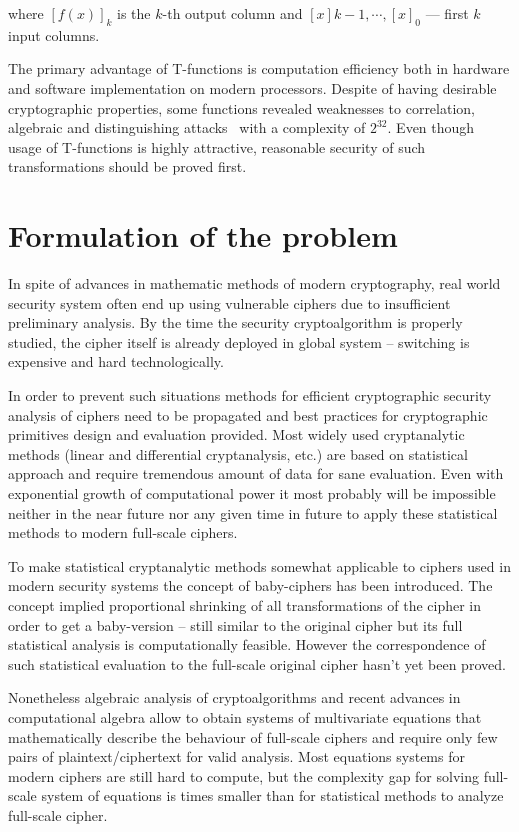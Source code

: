where $\left[ f(x) \right]_k$ is the $k$-th output column and 
$[x]k-1, \cdots, [x]_0$ --- first $k$ input columns.

The primary advantage of T-functions is computation efficiency both in hardware
and software implementation on modern processors. Despite of having desirable
cryptographic properties, some functions revealed weaknesses to correlation,
algebraic and distinguishing attacks~\cite{mycrypt/kunzli_jm05} with a complexity of
$2^{32}$. Even though usage of T-functions is highly attractive, reasonable
security of such transformations should be proved first.


\section{Formulation of the problem}

In spite of advances in mathematic methods of modern cryptography, real world
security system often end up using vulnerable ciphers due to insufficient
preliminary analysis. By the time the security cryptoalgorithm is properly
studied, the cipher itself is already deployed in global system -- switching is
expensive and hard technologically.

In order to prevent such situations methods for efficient cryptographic security
analysis of ciphers need to be propagated and best practices for cryptographic
primitives design and evaluation provided. Most widely used cryptanalytic
methods (linear and differential cryptanalysis, etc.) are based on statistical
approach and require tremendous amount of data for sane evaluation. Even with
exponential growth of computational power it most probably will be impossible
neither in the near future nor any given time in future to apply these
statistical methods to modern full-scale ciphers.

To make statistical cryptanalytic methods somewhat applicable to ciphers used in
modern security systems the concept of baby-ciphers has been introduced. The
concept implied proportional shrinking of all transformations of the cipher in
order to get a baby-version -- still similar to the original cipher but its full
statistical analysis is computationally feasible. However the correspondence of
such statistical evaluation to the full-scale original cipher hasn't yet been
proved.

Nonetheless algebraic analysis of cryptoalgorithms and recent advances in
computational algebra allow to obtain systems of multivariate equations that
mathematically describe the behaviour of full-scale ciphers and require only few
pairs of \mbox{plaintext/ciphertext} for valid analysis. Most equations systems
for modern ciphers are still hard to compute, but the complexity gap for solving
full-scale system of equations is times smaller than for statistical methods to
analyze full-scale cipher.

